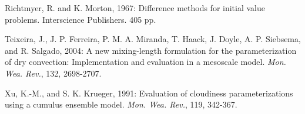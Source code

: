 \documentclass[12pt,titlepage]{article}
\numberwithin{equation}{section}
\begin{document}
\begin{thebibliography}{9}
Richtmyer, R. and K. Morton, 1967: Difference methods for initial value problems.  Interscience Publishers.  405 pp. 

Teixeira, J., J. P. Ferreira, P. M. A. Miranda, T. Haack, J. Doyle, A. P. Siebsema, and R. Salgado, 2004: A new mixing-length formulation for the parameterization of dry convection: Implementation and evaluation in a mesoscale model.  \textit{Mon. Wea. Rev.}, 132, 2698-2707. 

Xu, K.-M., and S. K. Krueger, 1991: Evaluation of cloudiness parameterizations using a cumulus ensemble model.  \textit{Mon. Wea. Rev.}, 119, 342-367.  

\end{thebibliography}
\end{document}
